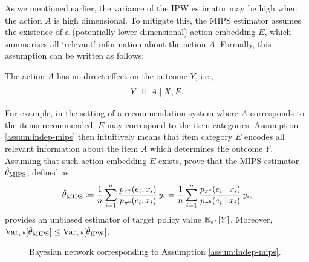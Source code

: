 
As we mentioned earlier, the variance of the IPW estimator may be high when the action $A$ is high dimensional. To mitigate this, the MIPS estimator assumes the existence of a (potentially lower dimensional) action embedding $E$, which summarises all `relevant' information about the action $A$. Formally, this assumption can be written as follows: 
\begin{assumption}\label{assum:indep-mips}
    The action $A$ has no direct effect on the outcome $Y$, i.e., 
    $$Y \perp \!\!\! \perp A \mid X, E.$$
\end{assumption}
For example, in the setting of a recommendation system where $A$ corresponds to the items recommended, $E$ may correspond to the item categories. Assumption \ref{assum:indep-mips} then intuitively means that item category $E$ encodes all relevant information about the item $A$ which determines the outcome $Y$. Assuming that such action embedding $E$ exists, \cite{saito2022off} prove that the MIPS estimator $\hat{\theta}_{\textup{MIPS}}$, defined as
\[
\hat{\theta}_{\textup{MIPS}} \coloneqq \frac{1}{n}\sum_{i=1}^n \frac{p_{\pi^*}(e_i, x_i)}{p_{\pi^b}(e_i, x_i)}\, y_i = \frac{1}{n}\sum_{i=1}^n \frac{p_{\pi^*}(e_i\mid x_i)}{p_{\pi^b}(e_i \mid x_i)}\, y_i,
\]
provides an unbiased estimator of target policy value $\mathbb{E}_{\pi^*}[Y]$. Moreover,
$\textup{Var}_{\pi^b}[\hat{\theta}_{\textup{MIPS}}] \leq \textup{Var}_{\pi^b}[\hat{\theta}_{\textup{IPW}}]$.

\begin{figure}[ht]
\centering
{}
\caption{Bayesian network corresponding to Assumption \ref{assum:indep-mips}.}
\label{fig:embedding_mips}
\vspace{-0.2cm}
\end{figure}



